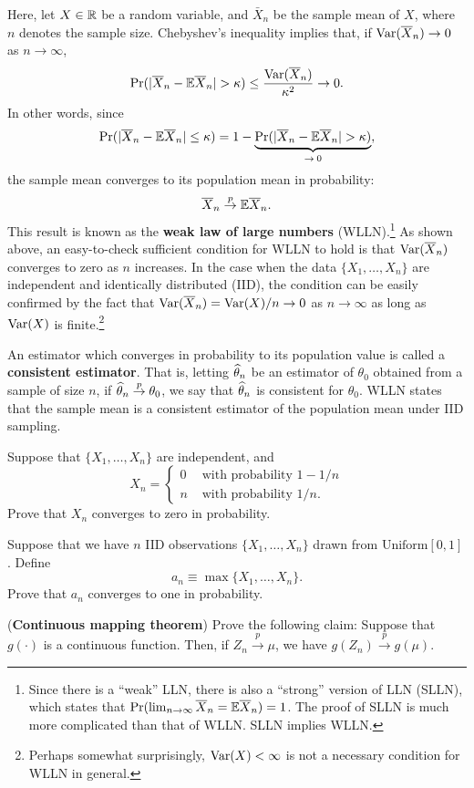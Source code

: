\documentclass[11pt, A4paper, openany, uplatex]{book}
\begin{document}
Here, let $X \in \mathbb{R}$ be a random variable, and $\bar X_n$ be the sample mean of $X$, where $n$ denotes the sample size.
Chebyshev's inequality implies that, if $\mathrm{Var}(\overline X_n) \to 0$ as $n \to \infty$,
\[
\Pr( |\overline X_n - \mathbb{E} \overline X_n | > \kappa ) \leq \frac{\mathrm{Var}(\overline X_n)}{\kappa^2} \to 0.
\]
In other words, since 
\[
	\Pr( |\overline X_n - \mathbb{E}\overline X_n | \le \kappa ) = 1 - \underbrace{\Pr( |\overline X_n - \mathbb{E}\overline X_n | > \kappa )}_{\to \: 0},
\]
the sample mean converges to its population mean in probability:
\[
\overline X_n \overset{p}{\to} \mathbb{E}\overline X_n.
\]
This result is known as the \textbf{weak law of large numbers} (WLLN).\footnote{	
	Since there is a ``weak'' LLN, there is also a ``strong'' version of LLN (SLLN), which states that $\Pr(\lim_{n \to \infty} \overline X_n = \mathbb{E} \overline X_n) = 1$.
	The proof of SLLN is much more complicated than that of WLLN.
	SLLN implies WLLN.}
As shown above, an easy-to-check sufficient condition for WLLN to hold is that $\mathrm{Var}(\overline X_n)$ converges to zero as $n$ increases.
In the case when the data $\{X_1, \ldots , X_n\}$ are independent and identically distributed (IID), the condition can be easily confirmed by the fact that $\mathrm{Var}(\overline X_n) = \mathrm{Var}(X)/n \to 0$ as $n \to \infty$ as long as $\mathrm{Var}(X)$ is finite.\footnote{
	Perhaps somewhat surprisingly, $\mathrm{Var}(X) < \infty$ is not a necessary condition for WLLN in general.
	}
\bigskip

An estimator which converges in probability to its population value is called a \textbf{consistent estimator}.
That is, letting $\widehat \theta_n$ be an estimator of $\theta_0$ obtained from a sample of size $n$, if $\widehat \theta_n \overset{p}{\to} \theta_0$, we say that $\widehat \theta_n$ is consistent for $\theta_0$.
WLLN states that the sample mean is a consistent estimator of the population mean under IID sampling.

\hrulefill
\begin{exercise}\upshape
	Suppose that $\{X_1, \ldots, X_n\}$ are independent, and
	\[
	X_n = \left\{\begin{array}{ll}
	0 & \text{ with probability } 1-1/n\\
	n & \text{ with probability } 1/n.
	\end{array}\right.
	\]
	Prove that $X_n$ converges to zero in probability.
\end{exercise}
\begin{exercise}\upshape
	Suppose that we have $n$ IID observations $\{X_1, \ldots, X_n\}$ drawn from $\text{Uniform}[0,1]$.
	Define 
	\[
	a_n \equiv \max\{X_1, \ldots, X_n\}.
	\]
	Prove that $a_n$ converges to one in probability.
\end{exercise}
\begin{exercise}\upshape
	(\textbf{Continuous mapping theorem}) 
	Prove the following claim: Suppose that $g(\cdot)$ is a continuous function.
	Then, if $Z_n \overset{p}{\to} \mu$, we have $g(Z_n) \overset{p}{\to} g(\mu)$.
\end{exercise}
\end{document}
